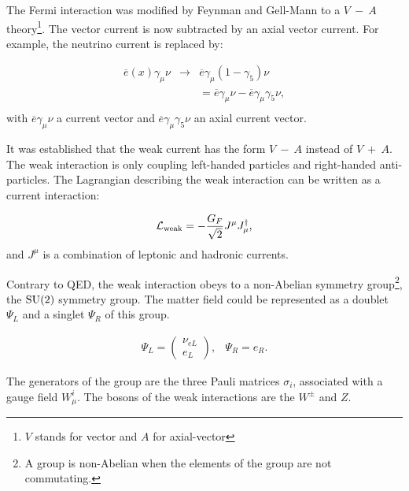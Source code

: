     The Fermi interaction was modified by Feynman and Gell-Mann \cite{PhysRev.109.193} to a $V~-~A$ theory\footnote{$V$ stands for vector and $A$ for axial-vector}.
    The vector current is now subtracted by an axial vector current. 
    For example, the neutrino current is replaced by:

    \begin{equation}
        \begin{array}{rcc}
        \overline{e}(x) \gamma_{\mu} \nu & \rightarrow & \overline{e}\gamma_{\mu}(1 - \gamma_5 ) \nu \\
            & & = \overline{e} \gamma_{\mu} \nu - \overline{e}\gamma_{\mu} \gamma_5 \nu, \\
        \end{array}
    \end{equation}
    with $\overline{e} \gamma_{\mu} \nu$ a current vector and $\overline{e}\gamma_{\mu} \gamma_5 \nu$ an axial current vector.

    It was established that the weak current has the form $V~-~A$ instead of $V~+~A$.
    The weak interaction is only coupling left-handed particles and right-handed anti-particles.
    The Lagrangian describing the weak interaction can be written as a current interaction:

    \begin{equation}
      \mathcal{L}_{\rm{weak}} = - \frac{G_F}{\sqrt{2}} J^{\mu}J_{\mu}^{\dagger},
    \end{equation}
     and $J^{\mu}$ is a combination of leptonic and hadronic currents.

    Contrary to \gls{QED}, the weak interaction obeys to a non-Abelian symmetry group\footnote{A group is non-Abelian when the elements of the group are not commutating.}, the $\rm{SU}(2)$ symmetry group.
    The matter field could be represented as a doublet $\Psi_L$ and a singlet $\Psi_R$ of this group.

    \begin{equation}
      \begin{array}{cc}
        \Psi_L = 
         \begin{pmatrix}
           \nu_{eL} \\
           e_L
         \end{pmatrix}, & \Psi_R = e_R.
      \end{array}
    \end{equation}

    The generators of the group are the three Pauli matrices $\sigma_i$, associated with a gauge field $W_{\mu}^i$.
    The bosons of the weak interactions are the $W^{\pm}$ and $Z$.

